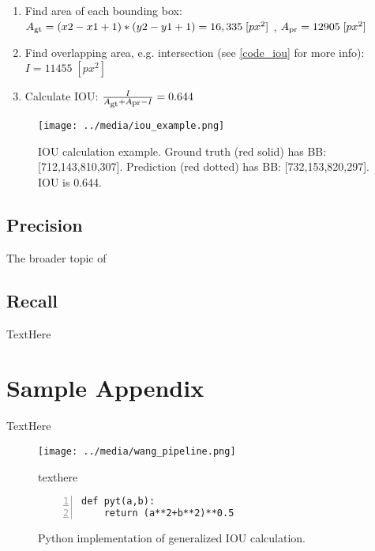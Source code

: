 \def \pxpx {\; [px^2]}
\def \Asub #1{A\textsubscript{#1}}
\begin{enumerate}\itemsep=-0.5em

\item Find area of each bounding box: \\ $\Asub{gt} = (x2-x1+1)*(y2-y1+1) = 16,335 \pxpx $ , $ \Asub{pr} = 12905 \pxpx $

\item Find overlapping area, e.g. intersection (see \ref{code_iou} for more info): $I = 11455 \pxpx $

\item Calculate IOU: $\frac{I}{\Asub{gt} + \Asub{pr} - I} = 0.644 $
\end{enumerate}

\begin{figure}[h] %
    \centering
    \texttt{[image: ../media/iou\_example.png]}
    \caption{IOU calculation example. Ground truth (red solid) has BB: [712,143,810,307]. Prediction (red dotted) has BB: [732,153,820,297]. IOU is 0.644.}
    \label{iou_example} %
\end{figure}


\subsection{Precision}
The broader topic of 

\subsection{Recall}
TextHere










\section{Sample Appendix}
TextHere

\begin{figure}[h] %
    \texttt{[image: ../media/wang\_pipeline.png]}
    \caption{texthere}
    \label{delme_figure} %
\end{figure}


\begin{figure}[h] %
\begin{lstlisting}[numbers=left]
def pyt(a,b):
    return (a**2+b**2)**0.5
\end{lstlisting}
\onehalfspacing %
\caption{Python implementation of generalized IOU calculation.}
\label{delme_code} %
\end{figure}


